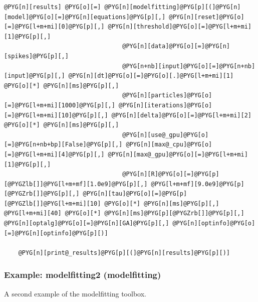 \documentclass[letterpaper,10pt,english]{manual}
\begin{document}
\begin{Verbatim}[commandchars=@\[\]]
    @PYG[n][results] @PYG[o][=] @PYG[n][modelfitting]@PYG[p][(]@PYG[n][model]@PYG[o][=]@PYG[n][equations]@PYG[p][,] @PYG[n][reset]@PYG[o][=]@PYG[l+m+mi][0]@PYG[p][,] @PYG[n][threshold]@PYG[o][=]@PYG[l+m+mi][1]@PYG[p][,]
                                 @PYG[n][data]@PYG[o][=]@PYG[n][spikes]@PYG[p][,]
                                 @PYG[n+nb][input]@PYG[o][=]@PYG[n+nb][input]@PYG[p][,] @PYG[n][dt]@PYG[o][=]@PYG[o][.]@PYG[l+m+mi][1] @PYG[o][*] @PYG[n][ms]@PYG[p][,]
                                 @PYG[n][particles]@PYG[o][=]@PYG[l+m+mi][1000]@PYG[p][,] @PYG[n][iterations]@PYG[o][=]@PYG[l+m+mi][10]@PYG[p][,] @PYG[n][delta]@PYG[o][=]@PYG[l+m+mi][2] @PYG[o][*] @PYG[n][ms]@PYG[p][,]
                                 @PYG[n][use@_gpu]@PYG[o][=]@PYG[n+nb+bp][False]@PYG[p][,] @PYG[n][max@_cpu]@PYG[o][=]@PYG[l+m+mi][4]@PYG[p][,] @PYG[n][max@_gpu]@PYG[o][=]@PYG[l+m+mi][1]@PYG[p][,]
                                 @PYG[n][R]@PYG[o][=]@PYG[p][@PYGZlb[]]@PYG[l+m+mf][1.0e9]@PYG[p][,] @PYG[l+m+mf][9.0e9]@PYG[p][@PYGZrb[]]@PYG[p][,] @PYG[n][tau]@PYG[o][=]@PYG[p][@PYGZlb[]]@PYG[l+m+mi][10] @PYG[o][*] @PYG[n][ms]@PYG[p][,] @PYG[l+m+mi][40] @PYG[o][*] @PYG[n][ms]@PYG[p][@PYGZrb[]]@PYG[p][,] @PYG[n][optalg]@PYG[o][=]@PYG[n][GA]@PYG[p][,] @PYG[n][optinfo]@PYG[o][=]@PYG[n][optinfo]@PYG[p][)]

    @PYG[n][print@_results]@PYG[p][(]@PYG[n][results]@PYG[p][)]
\end{Verbatim}

\resetcurrentobjects
\hypertarget{--doc-examples-modelfitting_modelfitting2}{}

\hypertarget{index-75}{}\subsubsection{Example: modelfitting2 (modelfitting)}

A second example of the modelfitting toolbox.
\end{document}
